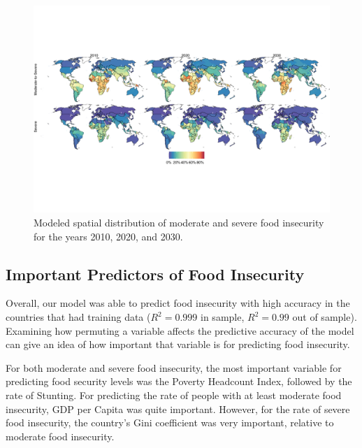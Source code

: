 \documentclass{article}
\begin{document}
\begin{landscape}
\begin{figure}[h]
  \centering
  \includegraphics{img/FullMap.png}
  \caption{Modeled spatial distribution of moderate and severe food insecurity for the years 2010, 2020, and 2030.}
  \label{fig:map}
\end{figure}
\end{landscape}

\subsection{Important Predictors of Food Insecurity}
Overall, our model was able to predict food insecurity with high accuracy in the countries that had training data ($R^2 = 0.999$ in sample, $R^2 = 0.99$ out of sample).  Examining how permuting a variable affects the predictive accuracy of the model can give an idea of how important that variable is for predicting food insecurity.  

For both moderate and severe food insecurity, the most important variable for predicting food security levels was the Poverty Headcount Index, followed by the rate of Stunting.  For predicting the rate of people with at least moderate food insecurity, GDP per Capita was quite important.  However, for the rate of severe food insecurity, the country's Gini coefficient was very important, relative to moderate food insecurity.
\end{document}
